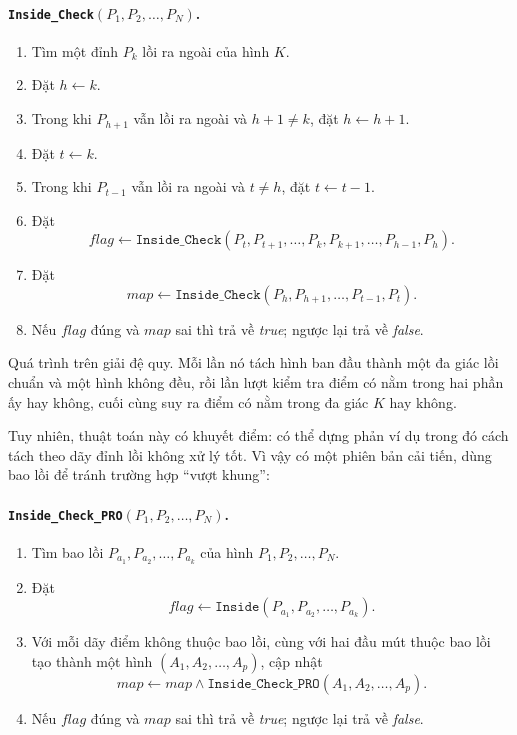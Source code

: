 \documentclass[11pt]{article}
\begin{document}
\paragraph{\texttt{Inside\_Check}$(P_1,P_2,\ldots,P_N)$.}
\begin{enumerate}
  \item Tìm một đỉnh $P_k$ lồi ra ngoài của hình $K$.
  \item Đặt $h\leftarrow k$.
  \item Trong khi $P_{h+1}$ vẫn lồi ra ngoài và $h+1\ne k$, đặt
  $h\leftarrow h+1$.
  \item Đặt $t\leftarrow k$.
  \item Trong khi $P_{t-1}$ vẫn lồi ra ngoài và $t\ne h$, đặt
  $t\leftarrow t-1$.
  \item Đặt
  \[
    \mathit{flag}\leftarrow
    \texttt{Inside\_Check}(P_t,P_{t+1},\ldots,P_k,P_{k+1},\ldots,P_{h-1},P_h).
  \]
  \item Đặt
  \[
    \mathit{map}\leftarrow
    \texttt{Inside\_Check}(P_h,P_{h+1},\ldots,P_{t-1},P_t).
  \]
  \item Nếu $\mathit{flag}$ đúng và $\mathit{map}$ sai thì trả về
  \textit{true}; ngược lại trả về \textit{false}.
\end{enumerate}

Quá trình trên giải đệ quy. Mỗi lần nó tách hình ban đầu thành một đa giác lồi
chuẩn và một hình không đều, rồi lần lượt kiểm tra điểm có nằm trong hai phần
ấy hay không, cuối cùng suy ra điểm có nằm trong đa giác $K$ hay không.

Tuy nhiên, thuật toán này có khuyết điểm: có thể dựng phản ví dụ trong đó cách
tách theo dãy đỉnh lồi không xử lý tốt. Vì vậy có một phiên bản cải tiến, dùng
bao lồi để tránh trường hợp ``vượt khung'':

\paragraph{\texttt{Inside\_Check\_PRO}$(P_1,P_2,\ldots,P_N)$.}
\begin{enumerate}
  \item Tìm bao lồi $P_{a_1},P_{a_2},\ldots,P_{a_k}$ của hình
  $P_1,P_2,\ldots,P_N$.
  \item Đặt
  \[
    \mathit{flag}\leftarrow
    \texttt{Inside}(P_{a_1},P_{a_2},\ldots,P_{a_k}).
  \]
  \item Với mỗi dãy điểm không thuộc bao lồi, cùng với hai đầu mút thuộc bao
  lồi tạo thành một hình $(A_1,A_2,\ldots,A_p)$, cập nhật
  \[
    \mathit{map}\leftarrow
    \mathit{map}\land
    \texttt{Inside\_Check\_PRO}(A_1,A_2,\ldots,A_p).
  \]
  \item Nếu $\mathit{flag}$ đúng và $\mathit{map}$ sai thì trả về
  \textit{true}; ngược lại trả về \textit{false}.
\end{enumerate}
\end{document}
